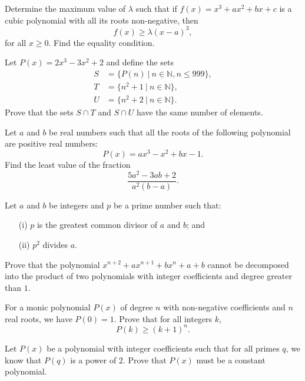 \documentclass[12pt,a4paper]{memoir}
\theoremstyle{definition}
\begin{document}
\begin{question}[name={1999 China}]
	Determine the maximum value of $\lambda$ such that if $f(x) = x^3 +ax^2 +bx+c$ is a cubic polynomial with all its roots non-negative, then
	\[f(x)\geq\lambda(x -a)^3,\] for all $x\geq0$. Find the equality condition.
\end{question}

\begin{question}[name={1999 Poland}]
	Let $P(x)=2x^3-3x^2+2$ and define the sets
	\begin{align*}
		S &= \{P(n) \ | \ n \in \mathbb N, n \leq 999\},\\
		T &= \{n^2+1 \ | \ n \in \mathbb N\},\\
		U &= \{n^2+2 \ | \ n \in \mathbb N\}.
	\end{align*}
	Prove that the sets $S \cap T$ and $S \cap U$ have the same number of elements.
\end{question}


\begin{question}[name={1999 Vietnam}]
	Let $a$ and $b$ be real numbers such that all the roots of the following polynomial are positive real numbers: \[P(x)=ax^3-x^2+bx-1.\]
	Find the least value of the fraction \[\frac{5a^2-3ab+2}{a^2(b-a)}.\]
\end{question}


\begin{question}[name={1995 Korea}]
	Let $a$ and $b$ be integers and $p$ be a prime number such that:
	\begin{itemize}
		\item[(i)] $p$ is the greatest common divisor of $a$ and $b$; and
		\item[(ii)] $p^2$ divides $a$.
	\end{itemize}
	Prove that the polynomial $x^{n+2}+ax^{n+1}+bx^{n}+a+b$ cannot be decomposed into the product of two polynomials with integer coefficients and degree greater than $1$.
\end{question}


\begin{question}
	For a monic polynomial $P(x)$ of degree $n$ with non-negative coefficients and $n$ real roots, we have $P(0)=1$. Prove that for all integers $k$, \[P(k) \geq (k+1)^n.\]
\end{question}


\begin{question}
	Let $P(x)$ be a polynomial with integer coefficients such that for all primes $q$, we know that $P(q)$ is a power of $2$. Prove that $P(x)$ must be a constant polynomial.
\end{question}
\end{document}
